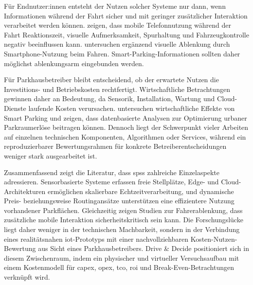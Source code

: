 Für Endnutzer:innen entsteht der Nutzen solcher Systeme nur dann, wenn Informationen während der Fahrt sicher und mit geringer zusätzlicher Interaktion verarbeitet werden können. \citet{oviedo-trespalaciosUnderstandingImpactsMobile2016} zeigen, dass mobile Telefonnutzung während der Fahrt Reaktionszeit, visuelle Aufmerksamkeit, Spurhaltung und Fahrzeugkontrolle negativ beeinflussen kann. \citet{fancelloAnalysisVisualDistraction2025} untersuchen ergänzend visuelle Ablenkung durch Smartphone-Nutzung beim Fahren. Smart-Parking-Informationen sollten daher möglichst ablenkungsarm eingebunden werden.

Für Parkhausbetreiber bleibt entscheidend, ob der erwartete Nutzen die Investitions- und Betriebskosten rechtfertigt. Wirtschaftliche Betrachtungen gewinnen daher an Bedeutung, da Sensorik, Installation, Wartung und Cloud-Dienste laufende Kosten verursachen. \citet{wangEconomicsSmartParking2025} untersuchen wirtschaftliche Effekte von Smart Parking und zeigen, dass datenbasierte Analysen zur Optimierung urbaner Parkraumerlöse beitragen können. Dennoch liegt der Schwerpunkt vieler Arbeiten auf einzelnen technischen Komponenten, Algorithmen oder Services, während ein reproduzierbarer Bewertungsrahmen für konkrete Betreiberentscheidungen weniger stark ausgearbeitet ist.

Zusammenfassend zeigt die Literatur, dass \acp{sps} zahlreiche Einzelaspekte adressieren. Sensorbasierte Systeme erfassen freie Stellplätze, Edge- und Cloud-Architekturen ermöglichen skalierbare Echtzeitverarbeitung, und dynamische Preis- beziehungsweise Routingansätze unterstützen eine effizientere Nutzung vorhandener Parkflächen. Gleichzeitig zeigen Studien zur Fahrerablenkung, dass zusätzliche mobile Interaktion sicherheitskritisch sein kann. Die Forschungslücke liegt daher weniger in der technischen Machbarkeit, sondern in der Verbindung eines realitätsnahen \ac{iot}-Prototyps mit einer nachvollziehbaren Kosten-Nutzen-Bewertung aus Sicht eines Parkhausbetreibers. Drive \& Decide positioniert sich in diesem Zwischenraum, indem ein physischer und virtueller Versuchsaufbau mit einem Kostenmodell für \ac{capex}, \ac{opex}, \ac{tco}, \ac{roi} und Break-Even-Betrachtungen verknüpft wird.

